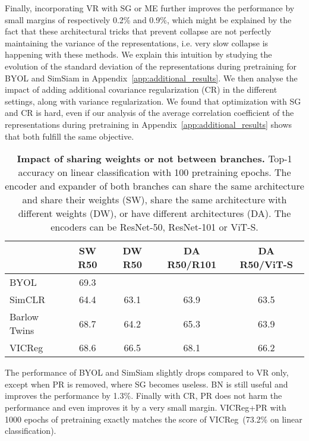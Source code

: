 \documentclass{article}
\newcommand{\algo}{VICReg}
\newcommand{\expander}{expander }
\begin{document}
Finally, incorporating VR with SG or ME further improves the performance by small margins of respectively 0.2\% and 0.9\%, which might be explained by the fact that these architectural tricks that prevent collapse are not perfectly maintaining the variance of the representations, i.e. very slow collapse is happening with these methods. We explain this intuition by studying the evolution of the standard deviation of the representations during pretraining for BYOL and SimSiam in Appendix~\ref{app:additional_results}. We then analyse the impact of adding additional covariance regularization (CR) in the different settings, along with variance regularization. We found that optimization with SG and CR is hard, even if our analysis of the average correlation coefficient of the representations during pretraining in Appendix~\ref{app:additional_results} shows that both fulfill the same objective. 

\newcommand{\xmark}{\ding{55}}\begin{table}[t]
\caption{\textbf{Impact of sharing weights or not between branches.} Top-1 accuracy on linear classification with 100 pretraining epochs. The encoder and \expander of both branches can share the same architecture and share their weights (SW), share the same architecture with different weights (DW), or have different architectures (DA). The encoders can be ResNet-50, ResNet-101 or ViT-S.}
\centering
\vspace{-2mm}
\label{tab:non-shared}
\begin{tabular}{lcccc}
\toprule
 & SW R50 & DW R50  & DA R50/R101 & DA R50/ViT-S \\
\midrule
BYOL          & 69.3  & \xmark & \xmark & \xmark \\
SimCLR        & 64.4  & 63.1 & 63.9 & 63.5 \\
Barlow Twins  & 68.7  & 64.2 & 65.3 & 63.9 \\
\algo         & 68.6  & 66.5 & 68.1 & 66.2\\
\bottomrule
\end{tabular}
\end{table}

The performance of BYOL and SimSiam slightly drops compared to VR only, except when PR is removed, where SG becomes useless. BN is still useful and improves the performance by 1.3\%. Finally with CR, PR does not harm the performance and even improves it by a very small margin. \algo+PR with 1000 epochs of pretraining exactly matches the score of \algo \ (73.2\% on linear classification).
\end{document}
